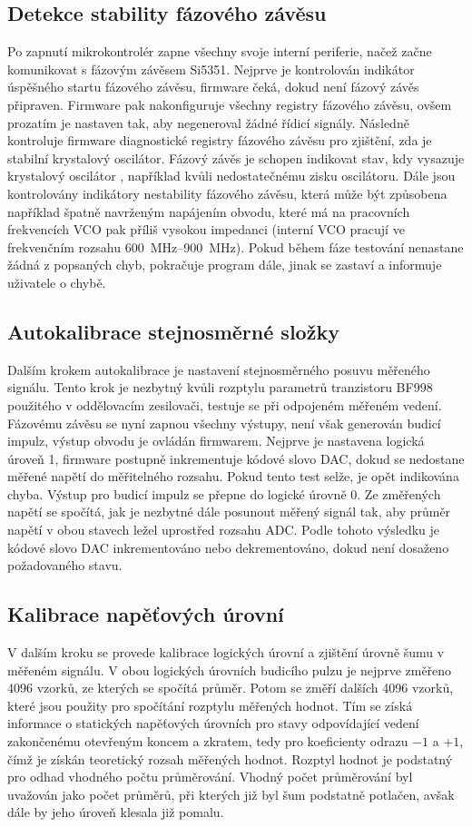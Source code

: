 \subsection{Detekce stability fázového závěsu}
Po zapnutí mikrokontrolér zapne všechny svoje interní periferie, načež začne komunikovat s fázovým závěsem Si5351. Nejprve je kontrolován indikátor úspěšného startu fázového závěsu, firmware čeká, dokud není fázový závěs připraven. Firmware pak nakonfiguruje všechny registry fázového závěsu, ovšem prozatím je nastaven tak, aby negeneroval žádné řídicí signály. Následně kontroluje firmware diagnostické registry fázového závěsu pro zjištění, zda je stabilní krystalový oscilátor. Fázový závěs je schopen indikovat stav, kdy vysazuje krystalový oscilátor \cite{Si5351datasheet}, například kvůli nedostatečnému zisku oscilátoru. Dále jsou kontrolovány indikátory nestability fázového závěsu, která může být způsobena například špatně navrženým napájením obvodu, které má na pracovních frekvencích \acrshort{VCO} pak příliš vysokou impedanci (interní \acrshort{VCO} pracují ve frekvenčním rozsahu \SIrange{600}{900}{\mega\hertz}). Pokud během fáze testování nenastane žádná z popsaných chyb, pokračuje program dále, jinak se zastaví a informuje uživatele o chybě.

\subsection{Autokalibrace stejnosměrné složky}
Dalším krokem autokalibrace je nastavení stejnosměrného posuvu měřeného signálu. Tento krok je nezbytný kvůli rozptylu parametrů tranzistoru BF998 použitého v oddělovacím zesilovači, testuje se při odpojeném měřeném vedení. Fázovému závěsu se nyní zapnou všechny výstupy, není však generován budicí impulz, výstup obvodu je ovládán firmwarem. Nejprve je nastavena logická úroveň 1, firmware postupně inkrementuje kódové slovo \acrshort{DAC}, dokud se nedostane měřené napětí do měřitelného rozsahu. Pokud tento test selže, je opět indikována chyba. Výstup pro budicí impulz se přepne do logické úrovně 0. Ze změřených napětí se spočítá, jak je nezbytné dále posunout měřený signál tak, aby průměr napětí v obou stavech ležel uprostřed rozsahu ADC. Podle tohoto výsledku je kódové slovo DAC inkrementováno nebo dekrementováno, dokud není dosaženo požadovaného stavu.

\subsection{Kalibrace napěťových úrovní}
V dalším kroku se provede kalibrace logických úrovní a zjištění úrovně šumu v měřeném signálu. V obou logických úrovních budicího pulzu je nejprve změřeno 4096 vzorků, ze kterých se spočítá průměr. Potom se změří dalších 4096 vzorků, které jsou použity pro spočítání rozptylu měřených hodnot. Tím se získá informace o statických napěťových úrovních pro stavy odpovídající vedení zakončenému otevřeným koncem a zkratem, tedy pro koeficienty odrazu $-1$ a $+1$, čímž je získán teoretický rozsah měřených hodnot. Rozptyl hodnot je podstatný pro odhad vhodného počtu průměrování. Vhodný počet průměrování byl uvažován jako počet průměrů, při kterých již byl šum podstatně potlačen, avšak dále by jeho úroveň klesala již pomalu.

